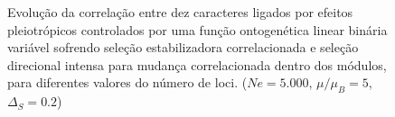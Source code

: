 \begin{figure}[htbp]
    \centering
    \vspace{11pt}
    \vspace{-18pt}
    \vspace{11pt}
    \caption{Evolução da correlação entre dez caracteres ligados por efeitos
        pleiotrópicos controlados por uma função ontogenética linear binária
        variável sofrendo seleção estabilizadora correlacionada e seleção
        direcional intensa para mudança correlacionada dentro dos módulos,
        para diferentes valores do número de loci. ($Ne=5.000$, $\mu/\mu_B=5$, $\Delta_S=0.2$)}
    \label{MBLR}
\end{figure}

